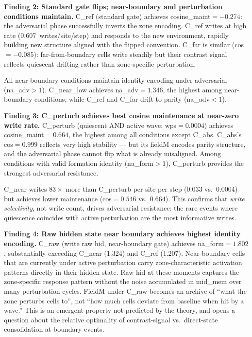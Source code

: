 \documentclass[11pt,a4paper]{article}
\begin{document}
\textbf{Finding 2: Standard gate flips; near-boundary and perturbation conditions maintain.}
C\_ref (standard gate) achieves cosine\_maint$=-0.274$: the adversarial phase
successfully inverts the zone encoding.
C\_ref writes at high rate (0.607~writes/site/step) and responds to the new
environment, rapidly building new structure aligned with the flipped convention.
C\_far is similar (cos$=-0.085$): far-from-boundary cells write steadily but
their contrast signal reflects quiescent drifting rather than zone-specific perturbation.

All near-boundary conditions maintain identity encoding under adversarial (na\_adv$>1$).
C\_near\_low achieves na\_adv$=1.346$, the highest among near-boundary conditions,
while C\_ref and C\_far drift to parity (na\_adv$<1$).

\textbf{Finding 3: C\_perturb achieves best cosine maintenance at near-zero write rate.}
C\_perturb (quiescent AND active wave: wps$=0.0004$) achieves cosine\_maint$=0.664$,
the highest among all conditions except C\_abs.
C\_abs's cos$=0.999$ reflects very high stability --- but its fieldM
encodes parity structure, and the adversarial phase cannot flip what is
already misaligned.
Among conditions with valid formation identity (na\_form$>1$), C\_perturb
provides the strongest adversarial resistance.

C\_near writes $83\times$ more than C\_perturb per site per step (0.033 vs.\ 0.0004)
but achieves lower maintenance (cos$=0.546$ vs.\ $0.664$).
This confirms that \emph{write selectivity}, not write count, drives adversarial
resistance: the rare events where quiescence coincides with active perturbation
are the most informative writes.

\textbf{Finding 4: Raw hidden state near boundary achieves highest identity encoding.}
C\_raw (write raw hid, near-boundary gate) achieves na\_form$=1.802$,
substantially exceeding C\_near (1.324) and C\_ref (1.207).
Near-boundary cells that are currently under active perturbation carry
zone-characteristic activation patterns directly in their hidden state.
Raw hid at these moments captures the zone-specific response pattern
without the noise accumulated in mid\_mem over many perturbation cycles.
FieldM under C\_raw becomes an archive of ``what the zone perturbs cells to'',
not ``how much cells deviate from baseline when hit by a wave.''
This is an emergent property not predicted by the theory, and opens a question
about the relative optimality of contrast-signal vs.\ direct-state consolidation
at boundary events.
\end{document}
